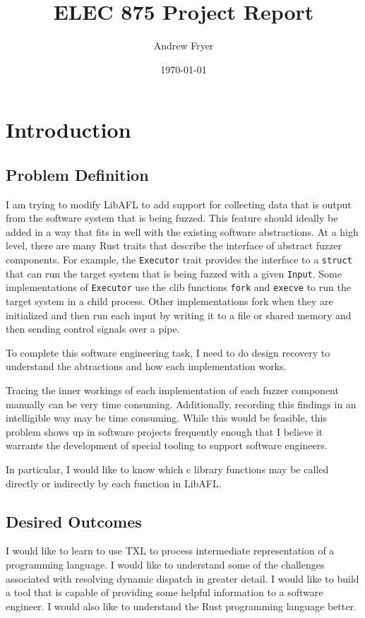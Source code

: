 \documentclass[11pt]{article}
\title{ELEC 875 Project Report}
\author{Andrew Fryer}
\date{\today}
\begin{document}
\maketitle

\section{Introduction}

\subsection{Problem Definition}

I am trying to modify LibAFL to add support for collecting data that is output from the software system that is being fuzzed.
This feature should ideally be added in a way that fits in well with the existing software abstractions.
At a high level, there are many Rust traits that describe the interface of abstract fuzzer components.
For example, the \lstinline{Executor} trait provides the interface to a \lstinline{struct} that can run the target system that is being fuzzed with a given \lstinline{Input}.
Some implementations of \lstinline{Executor} use the clib functions \lstinline{fork} and \lstinline{execve} to run the target system in a child process.
Other implementations fork when they are initialized and then run each input by writing it to a file or shared memory and then sending control signals over a pipe.

To complete this software engineering task, I need to do design recovery to understand the abtractions and how each implementation works.

Tracing the inner workings of each implementation of each fuzzer component manually can be very time consuming.
Additionally, recording this findings in an intelligible way may be time consuming.
While this would be feasible, this problem shows up in software projects frequently enough that I believe it warrants the development of special tooling to support software engineers.

In particular, I would like to know which c library functions may be called directly or indirectly by each function in LibAFL.

\subsection{Desired Outcomes}
I would like to learn to use TXL to process intermediate representation of a programming language.
I would like to understand some of the challenges associated with resolving dynamic dispatch in greater detail.
I would like to build a tool that is capable of providing some helpful information to a software engineer.
I would also like to understand the Rust programming language better.
\end{document}
